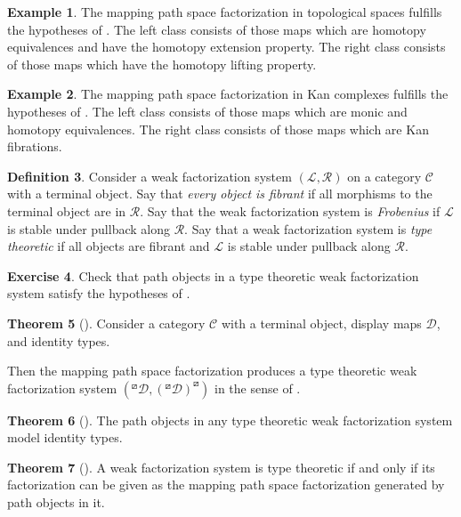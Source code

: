\documentclass{article}
\theoremstyle{definition}
\newtheorem{definition}{Definition}[section]
\newtheorem{theorem}[definition]{Theorem}
\newtheorem{exercise}[definition]{Exercise}
\newtheorem{example}[definition]{Example}
\newcommand{\C}{\mathcal C}
\newcommand{\D}{\mathcal D}
\begin{document}
\begin{example}
    The mapping path space factorization in topological spaces fulfills the hypotheses of . The left class consists of those maps which are homotopy equivalences and have the homotopy extension property. The right class consists of those maps which have the homotopy lifting property.
\end{example}

\begin{example}
    The mapping path space factorization in Kan complexes fulfills the hypotheses of . The left class consists of those maps which are monic and homotopy equivalences. The right class consists of those maps which are Kan fibrations.
\end{example}

\begin{definition}
    Consider a weak factorization system $(\mathcal L, \mathcal R)$ on a category $\C$ with a terminal object. Say that \emph{every object is fibrant} if all morphisms to the terminal object are in $\mathcal R$. Say that the weak factorization system is \emph{Frobenius} if $\mathcal L$ is stable under pullback along $\mathcal R$. Say that a weak factorization system is \emph{type theoretic} if all objects are fibrant and $\mathcal L$ is stable under pullback along $\mathcal R$.
\end{definition}

\begin{exercise}
    Check that path objects in a type theoretic weak factorization system satisfy the hypotheses of .
\end{exercise}

\begin{theorem}[\cite{gambino-garner}]
    Consider a category $\C$ with a terminal object, display maps $\D$, and identity types. 

    Then the mapping path space factorization produces a type theoretic weak factorization system $(^\boxslash\D, ({^\boxslash}\D)^\boxslash)$ in the sense of .
\end{theorem}

\begin{theorem}[\cite{north}]
    The path objects in any type theoretic weak factorization system model identity types.
\end{theorem}

\begin{theorem}[\cite{north}]
    A weak factorization system is type theoretic if and only if its factorization can be given as the mapping path space factorization generated by path objects in it.
\end{theorem}



\end{document}
